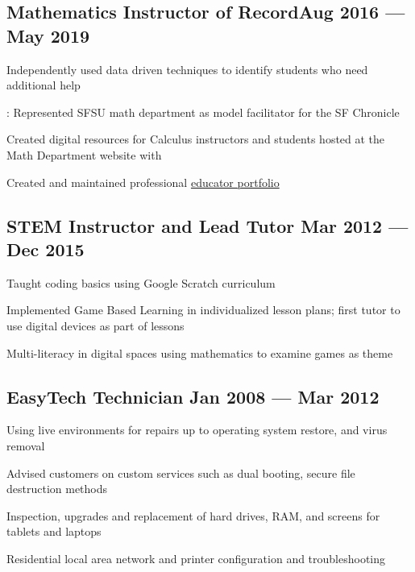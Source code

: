 \documentclass[letter,10pt]{article}
\begin{document}
\subsection{Mathematics Instructor of Record\hfill	Aug 2016 --- May 2019}
\begin{zitemize}
\item Independently used data driven techniques to identify students who need additional help
\item {}: Represented SFSU math department as model facilitator for the SF Chronicle
\item Created digital resources for Calculus instructors and students hosted at the Math Department website with 
\item Created and maintained professional  \href{http://www.mathwithtimmy.com}{ educator portfolio}
\end{zitemize}

\subsection{STEM Instructor and Lead Tutor \hfill	Mar 2012 --- Dec 2015}
\begin{zitemize}
\item Taught coding basics using Google Scratch curriculum
\item Implemented Game Based Learning in individualized lesson plans; first tutor to use digital devices as part of lessons
\item Multi-literacy in digital spaces using mathematics to examine games as theme
\end{zitemize}
\subsection{EasyTech Technician \hfill	Jan 2008 --- Mar 2012}
\begin{zitemize}
\item Using  live environments for repairs up to operating system restore, and virus removal
\item Advised customers on custom services such as dual booting, secure file destruction methods
\item Inspection, upgrades and replacement of hard drives, RAM, and screens for tablets and laptops
\item Residential local area network and printer configuration and troubleshooting
\end{zitemize}
\end{document}
